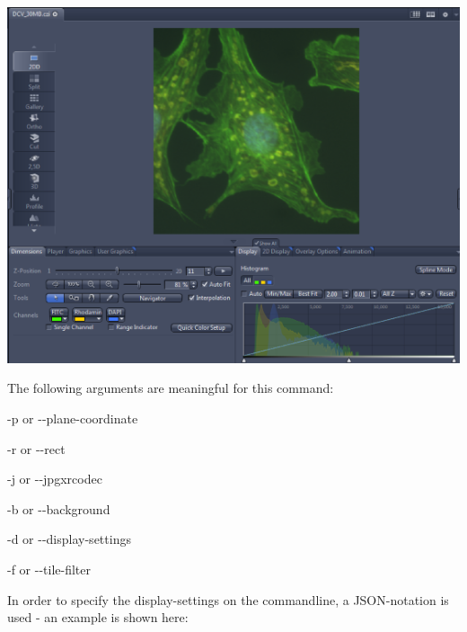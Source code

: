 \begin{DoxyImage}
\includegraphics[width=\textwidth,height=\textheight/2,keepaspectratio=true]{ZEN_screenshot_2.PNG}
\end{DoxyImage}


The following arguments are meaningful for this command\+:
\begin{DoxyItemize}
\item \textquotesingle{}-\/p\textquotesingle{} or \textquotesingle{}-\/-\/plane-\/coordinate\textquotesingle{}
\item \textquotesingle{}-\/r\textquotesingle{} or \textquotesingle{}-\/-\/rect\textquotesingle{}
\item \textquotesingle{}-\/j\textquotesingle{} or \textquotesingle{}-\/-\/jpgxrcodec\textquotesingle{}
\item \textquotesingle{}-\/b\textquotesingle{} or \textquotesingle{}-\/-\/background\textquotesingle{}
\item \textquotesingle{}-\/d\textquotesingle{} or \textquotesingle{}-\/-\/display-\/settings\textquotesingle{}
\item \textquotesingle{}-\/f\textquotesingle{} or \textquotesingle{}-\/-\/tile-\/filter\textquotesingle{}
\end{DoxyItemize}

In order to specify the display-\/settings on the commandline, a J\+S\+O\+N-\/notation is used -\/ an example is shown here\+: 


